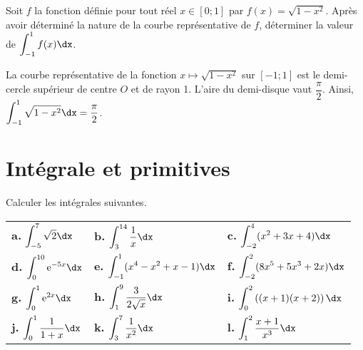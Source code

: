 \documentclass[11pt,fleqn, openany]{book} %
\begin{document}
\begin{exercise}[topic=int01]Soit $f$ la fonction définie pour tout réel $x \in [0;1]$ par $f(x)=\sqrt{1-x^2}$. Après avoir déterminé la nature de la courbe représentative de $f$, déterminer la valeur de $\displaystyle\int_{-1}^1 f(x)\dx$.\end{exercise}

\begin{solution}

La courbe représentative de la fonction $x\mapsto \sqrt{1-x^2}$ sur $[-1;1]$ est le demi-cercle supérieur de centre $O$ et de rayon 1. L'aire du demi-disque vaut $\dfrac{\pi}{2}$. Ainsi, $\displaystyle\int_{-1}^1  \sqrt{1-x^2}\dx=\dfrac{\pi}{2}$.
\begin{center}
\end{center}



\end{solution}



\section*{Intégrale et primitives}



 \begin{exercise}[topic=int02]Calculer les intégrales suivantes.  \renewcommand{\arraystretch}{2.5}
 \vspace{-0.5cm}
 \begin{center}
 \begin{tabularx}{\linewidth}{XXX}
 \textbf{a.} $\displaystyle\int_{-5}^{7} \sqrt{2} \dx$ &
 \textbf{b.} $\displaystyle\int_{3}^{14} \dfrac{1}{x} \dx$&
 \textbf{c.} $\displaystyle\int_{-2}^4 (x^2+3x+4) \dx$ \\
 \textbf{d.} $\displaystyle\int_{0}^{10} \e^{-5x} \dx$ &
 \textbf{e.}  $\displaystyle\int_{-1}^{1} (x^4-x^2+x-1) \dx$&
 \textbf{f.}    $\displaystyle\int_{-2}^{2} (8x^5+5x^3+2x) \dx$\\
 \textbf{g.} $\displaystyle\int_{0}^1 \e^{2x} \dx$&
  
 \textbf{h.} $\displaystyle\int_{1}^{9} \dfrac{3}{2\sqrt{x}} \dx$ &
 \textbf{i.} $\displaystyle\int_{0}^{2} \left((x+1)(x+2)\right) \dx$ \\
 \textbf{j.} $\displaystyle\int_{0}^{1} \dfrac{1}{1+x} \dx$ & \textbf{k.} $\displaystyle\int_3^7 \dfrac{1}{x^2}\dx$ & \textbf{l.} $\displaystyle\int_1^2 \dfrac{x+1}{x^3}\dx$
 \end{tabularx}\end{center}\end{exercise}
\end{document}
